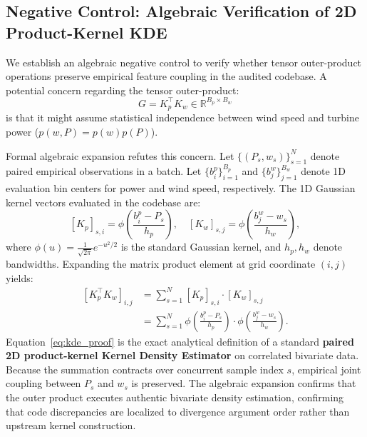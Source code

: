 \subsection{Negative Control: Algebraic Verification of 2D Product-Kernel KDE}
We establish an algebraic negative control to verify whether tensor outer-product operations preserve empirical feature coupling in the audited codebase. A potential concern regarding the tensor outer-product:
\begin{equation}
G = K_p^\top K_w \in \mathbb{R}^{B_p \times B_w}
\label{eq:outer_product}
\end{equation}
is that it might assume statistical independence between wind speed and turbine power ($p(w, P) = p(w)p(P)$).

Formal algebraic expansion refutes this concern. Let $\{ (P_s, w_s) \}_{s=1}^N$ denote paired empirical observations in a batch. Let $\{b_i^p\}_{i=1}^{B_p}$ and $\{b_j^w\}_{j=1}^{B_w}$ denote 1D evaluation bin centers for power and wind speed, respectively. The 1D Gaussian kernel vectors evaluated in the codebase are:
\begin{equation}
\left[K_p\right]_{s,i} = \phi\left( \frac{b_i^p - P_s}{h_p} \right), \quad \left[K_w\right]_{s,j} = \phi\left( \frac{b_j^w - w_s}{h_w} \right),
\label{eq:kernel_eval}
\end{equation}
where $\phi(u) = \frac{1}{\sqrt{2\pi}} e^{-u^2/2}$ is the standard Gaussian kernel, and $h_p, h_w$ denote bandwidths. Expanding the matrix product element at grid coordinate $(i,j)$ yields:
\begin{equation}
\begin{aligned}
\left[ K_p^\top K_w \right]_{i,j} &= \sum_{s=1}^N \left[K_p\right]_{s,i} \cdot \left[K_w\right]_{s,j} \\
&= \sum_{s=1}^N \phi\left( \frac{b_i^p - P_s}{h_p} \right) \cdot \phi\left( \frac{b_j^w - w_s}{h_w} \right).
\end{aligned}
\label{eq:kde_proof}
\end{equation}
Equation~\eqref{eq:kde_proof} is the exact analytical definition of a standard \textbf{paired 2D product-kernel Kernel Density Estimator} on correlated bivariate data. Because the summation contracts over concurrent sample index $s$, empirical joint coupling between $P_s$ and $w_s$ is preserved. The algebraic expansion confirms that the outer product executes authentic bivariate density estimation, confirming that code discrepancies are localized to divergence argument order rather than upstream kernel construction.
